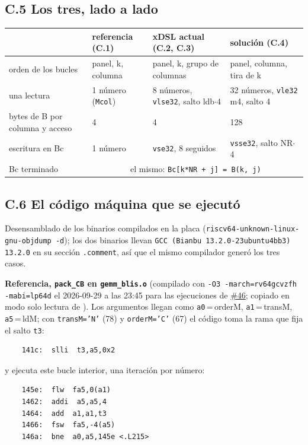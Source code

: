 \documentclass[10pt,a4paper]{article}
\newcommand{\iss}[1]{\href{https://github.com/JieGH/RVV_code_gen_via_MLIR_xDSL/issues/#1}{\##1}}
\begin{document}
\subsection*{C.5 Los tres, lado a lado}
\begin{center}\footnotesize\setlength{\tabcolsep}{4pt}
\begin{tabular}{@{}llll@{}}
\toprule
 & referencia (C.1) & xDSL actual (C.2, C.3) & solución (C.4) \\
\midrule
orden de los bucles & panel, k, columna & panel, k, grupo de columnas & panel, columna, tira de k \\
una lectura & 1 número (\texttt{Mcol}) & 8 números, \texttt{vlse32}, salto ldb$\cdot$4 & 32 números, \texttt{vle32} m4, salto 4 \\
bytes de B por columna y acceso & 4 & 4 & 128 \\
escritura en Bc & 1 número & \texttt{vse32}, 8 seguidos & \texttt{vsse32}, salto NR$\cdot$4 \\
Bc terminado & \multicolumn{3}{c}{el mismo: \texttt{Bc[k*NR + j] = B(k, j)}} \\
\bottomrule
\end{tabular}
\end{center}

\subsection*{C.6 El código máquina que se ejecutó}
Desensamblado de los binarios compilados en la placa (\texttt{riscv64-unknown-linux-gnu-objdump -d}); los dos binarios llevan
\texttt{GCC (Bianbu 13.2.0-23ubuntu4bb3) 13.2.0} en su sección \texttt{.comment}, así que el mismo compilador generó los tres casos.

\textbf{Referencia, \texttt{pack\_CB} en \texttt{gemm\_blis.o}} (compilado con \texttt{-O3 -march=rv64gcvzfh -mabi=lp64d} el
2026-09-29 a las 23:45 para las ejecuciones de \iss{46}; copiado en modo solo lectura de ).
Los argumentos llegan como \texttt{a0}\,=\,orderM, \texttt{a1}\,=\,transM, \texttt{a5}\,=\,ldM; con \texttt{transM='N'} (78) y
\texttt{orderM='C'} (67) el código toma la rama que fija el salto \texttt{t3}:
{\footnotesize\begin{verbatim}
    141c:  slli  t3,a5,0x2
\end{verbatim}}
y ejecuta este bucle interior, una iteración por número:
{\footnotesize\begin{verbatim}
    145e:  flw  fa5,0(a1)
    1462:  addi  a5,a5,4
    1464:  add  a1,a1,t3
    1466:  fsw  fa5,-4(a5)
    146a:  bne  a0,a5,145e <.L215>
\end{verbatim}}
\end{document}
